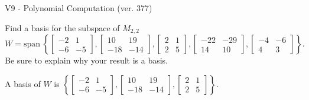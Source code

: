 \begin{exercise}
  \begin{exerciseTitle}V9 - Polynomial Computation (ver. 377)\end{exerciseTitle}
  \begin{exerciseStatement}
    Find a basis for the subspace of \(M_{2,2}\) 
\[W=\mathrm{span}\ \left\{\left[\begin{array}{cc}
-2 & 1 \\
-6 & -5
\end{array}\right] , \left[\begin{array}{cc}
10 & 19 \\
-18 & -14
\end{array}\right] , \left[\begin{array}{cc}
2 & 1 \\
2 & 5
\end{array}\right] , \left[\begin{array}{cc}
-22 & -29 \\
14 & 10
\end{array}\right] , \left[\begin{array}{cc}
-4 & -6 \\
4 & 3
\end{array}\right]\right\}.\]
 Be sure to explain why your result is a basis.


  \end{exerciseStatement}
  \begin{exerciseAnswer}
   A basis of \(W\) is  \(\left\{\left[\begin{array}{cc}
-2 & 1 \\
-6 & -5
\end{array}\right] , \left[\begin{array}{cc}
10 & 19 \\
-18 & -14
\end{array}\right] , \left[\begin{array}{cc}
2 & 1 \\
2 & 5
\end{array}\right]\right\}\).
  


  \end{exerciseAnswer}
\end{exercise}